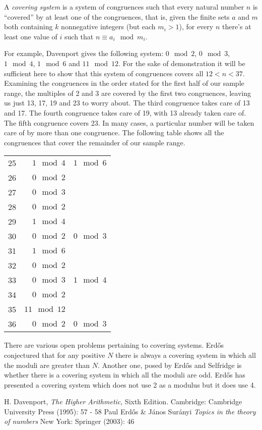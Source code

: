 \documentclass[12pt]{article}
\begin{document}
A {\em covering system} is a system of congruences such that every natural number $n$ is ``covered'' by at least one of the congruences, that is, given the finite sets $a$ and $m$ both containing $k$ nonnegative integers (but each $m_i > 1$), for every $n$ there's at least one value of $i$ such that $n \equiv a_i \mod m_i$.

For example, Davenport gives the following system: $0 \mod 2$, $0 \mod 3$, $1 \mod 4$, $1 \mod 6$ and $11 \mod 12$. For the sake of demonstration it will be sufficient here to show that this system of congruences covers all $12 < n < 37$. Examining the congruences in the order stated for the first half of our sample range, the multiples of 2 and 3 are covered by the first two congruences, leaving us just 13, 17, 19 and 23 to worry about. The third congruence takes care of 13 and 17. The fourth congruence takes care of 19, with 13 already taken care of. The fifth congruence covers 23. In many cases, a particular number will be taken care of by more than one congruence. The following table shows all the congruences that cover the remainder of our sample range.

\begin{tabular}{|r|r|r|}
25 &   $1 \mod 4$ & $1 \mod 6$ \\
26 &   $0 \mod 2$ &            \\
27 &   $0 \mod 3$ &            \\
28 &   $0 \mod 2$ &            \\
29 &   $1 \mod 4$ &            \\
30 &   $0 \mod 2$ & $0 \mod 3$ \\
31 &   $1 \mod 6$ &            \\
32 &   $0 \mod 2$ &            \\
33 &   $0 \mod 3$ & $1 \mod 4$ \\
34 &   $0 \mod 2$ &            \\
35 & $11 \mod 12$ &            \\
36 &   $0 \mod 2$ & $0 \mod 3$ \\
\end{tabular}

There are various open problems pertaining to covering systems. Erd\H{o}s conjectured that for any positive $N$ there is always a covering system in which all the moduli are greater than $N$. Another one, posed by Erd\H{o}s and Selfridge is whether there is a covering system in which all the moduli are odd. Erd\H{o}s has presented a covering system which does not use 2 as a modulus but it does use 4.

\begin{thebibliography}{2}
 H. Davenport, {\it The Higher Arithmetic}, Sixth Edition. Cambridge: Cambridge University Press (1995): 57 - 58
 Paul Erd\H{o}s \& J\'anos Sur\'anyi {\it Topics in the theory of numbers} New York: Springer (2003): 46
\end{thebibliography}
\end{document}
